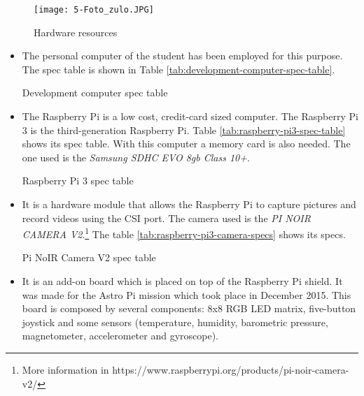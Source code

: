 \begin{figure}[!h]
	\begin{center}
		\texttt{[image: 5-Foto\_zulo.JPG]}
		\caption{Hardware resources}
		\label{fig:5-Foto_zulo}
	\end{center}
\end{figure}


\begin{itemize}
	\item {} The personal computer of the student has been employed for this purpose. The spec table is shown in Table \ref{tab:development-computer-spec-table}.
	
	\begin{table}[!h]
		\centering
		{\small
			
		}
		\caption{Development computer spec table}
		\label{tab:development-computer-spec-table}
	\end{table}
	
	\item {} The Raspberry Pi is a low cost, credit-card sized computer. The Raspberry Pi 3 is the third-generation Raspberry Pi. Table \ref{tab:raspberry-pi3-spec-table} shows its spec table. With this computer a memory card is also needed. The one used is the \emph{Samsung SDHC EVO 8gb Class 10+}.
	
	\begin{table}[!h]
		\centering
		{\small
			
		}
		\caption{Raspberry Pi 3 spec table}
		\label{tab:raspberry-pi3-spec-table}
	\end{table}
	
	\item {} It is a hardware module that allows the Raspberry Pi to capture pictures and record videos using the CSI port. The camera used is the \emph{PI NOIR CAMERA V2}.\footnote{More information in https://www.raspberrypi.org/products/pi-noir-camera-v2/} The table \ref{tab:raspberry-pi3-camera-specs} shows its specs. \label{itm:Pi-camera-module-v2}
	
	\begin{table}[!h]
		\centering
		{\small
			
		}
		\caption{Pi NoIR Camera V2 spec table}
		\label{tab:raspberry-pi3-camera-specs}
	\end{table}

	\item {} It is an add-on board which is placed on top of the Raspberry Pi shield. It was made for the Astro Pi mission which took place in December 2015. This board is composed by several components: 8x8 RGB LED matrix, five-button joystick and some sensors (temperature, humidity, barometric pressure, magnetometer, accelerometer and gyroscope).
	

\end{itemize}
